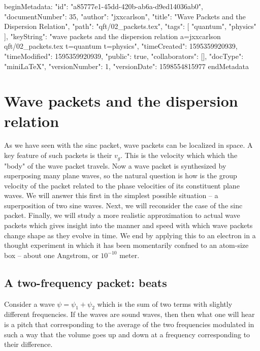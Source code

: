 beginMetadata:
{
    "id": "a85777e1-45dd-420b-ab6a-d9ed14036ab0",
    "documentNumber": 35,
    "author": "jxxcarlson",
    "title": "Wave Packets and the Dispersion Relation",
    "path": "qft/02_packets.tex",
    "tags": [
        "quantum",
        "physics"
    ],
    "keyString": "wave packets and the dispersion relation a=jxxcarlson qft/02_packets.tex t=quantum t=physics",
    "timeCreated": 1595359920939,
    "timeModified": 1595359920939,
    "public": true,
    "collaborators": [],
    "docType": "miniLaTeX",
    "versionNumber": 1,
    "versionDate": 1598554815977
}
endMetadata

\setcounter{section}{2}

\section{Wave packets and the dispersion relation}



As we have seen with the sinc packet, wave packets can be localized in space.  A key feature of such packets is their  $v_g$.  This is the velocity which which the "body" of the wave packet travels.  Now a wave packet is synthesized by superposing many plane waves, so the natural question is how is the group velocity of the packet related to the phase velocities of its constituent plane waves.  We will answer this first in the simplest possible situation -- a superposition of two sine waves.  Next, we will reconsider the case of the sinc packet.  Finally, we will study a more realistic approximation to actual wave packets which gives insight into the manner and speed with which wave packets change shape as they evolve in time.  We end by applying this to an electron in a thought experiment in which it has been momentarily confned to an atom-size box -- about one Angstrom, or $10^{-10}\text{ meter}$.



\subsection{A two-frequency packet: beats}

Consider a wave 
$\psi = \psi_1 + \psi_2$ which is the sum of two terms with slightly different frequencies.  If the waves are sound waves, then then what one will hear is a pitch that corresponding to the average of the two frequencies modulated in such a way that the volume goes up and down at a frequency corresponding to their difference.

